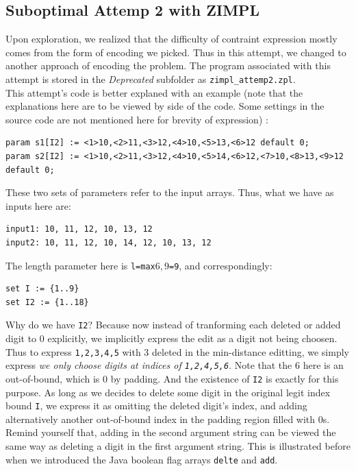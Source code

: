 \documentclass{article}
\begin{document}
\subsection{Suboptimal Attemp 2 with ZIMPL}
Upon exploration, we realized that the difficulty of contraint expression mostly comes from the form of encoding we picked. Thus in this attempt, we changed to another approach of encoding the problem. The program associated with this attempt is stored in the \textit{Deprecated} subfolder as \texttt{zimpl\_attemp2.zpl}. \\

This attempt's code is better explaned with an example (note that the explanations here are to be viewed by side of the code. Some settings in the source code are not mentioned here for brevity of expression) :
\begin{lstlisting}
param s1[I2] := <1>10,<2>11,<3>12,<4>10,<5>13,<6>12 default 0;
param s2[I2] := <1>10,<2>11,<3>12,<4>10,<5>14,<6>12,<7>10,<8>13,<9>12 default 0;
\end{lstlisting}
These two sets of parameters refer to the input arrays. Thus, what we have as inputs here are:
\begin{lstlisting}
input1: 10, 11, 12, 10, 13, 12
input2: 10, 11, 12, 10, 14, 12, 10, 13, 12
\end{lstlisting}
The length parameter here is \texttt{l=max\(6,9\)=9}, and correspondingly:
\begin{lstlisting}
set I := {1..9}
set I2 := {1..18}
\end{lstlisting}
Why do we have \texttt{I2}? Because now instead of tranforming each deleted or added digit to 0 explicitly, we implicitly express the edit as a digit not being choosen. Thus to express \texttt{1,2,3,4,5} with 3 deleted in the min-distance editting, we simply express \textit{we only choose digits at indices of \texttt{1,2,4,5,6}}. Note that the 6 here is an out-of-bound, which is 0 by padding. And the existence of \texttt{I2} is exactly for this purpose. As long as we decides to delete some digit in the original legit index bound \texttt{I}, we express it as omitting the deleted digit's index, and adding alternatively another out-of-bound index in the padding region filled with 0s. Remind yourself that, adding in the second argument string can be viewed the same way as deleting a digit in the first argument string. This is illustrated before when we introduced the Java boolean flag arrays \texttt{delte} and \texttt{add}.\\
\end{document}
